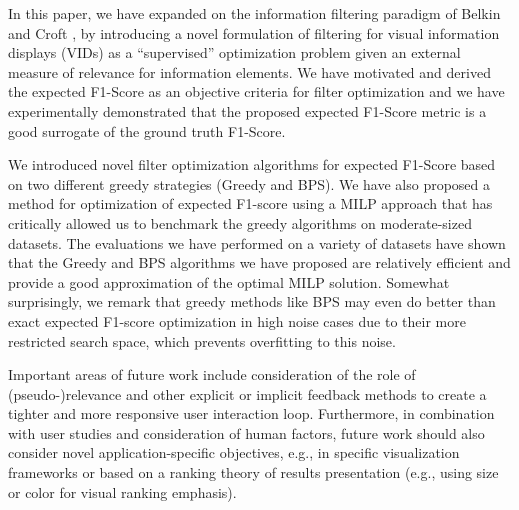 


In this paper, we have expanded on the information filtering paradigm of Belkin and Croft \citep{Belkin1992}, by  introducing a novel formulation of filtering for visual information displays (VIDs) as a ``supervised'' optimization problem given an external measure of relevance for  information elements.  We have motivated and derived the expected F1-Score as an objective criteria for filter optimization and we have experimentally demonstrated that the proposed expected F1-Score metric is a good surrogate of the ground truth F1-Score.

We introduced novel filter optimization algorithms for expected F1-Score based on two different greedy strategies (Greedy and BPS).  We have also proposed a method for optimization of expected F1-score using a MILP approach that has critically allowed us to benchmark the greedy algorithms on moderate-sized datasets. The evaluations we have performed on a variety of datasets have shown that the Greedy and BPS algorithms we have proposed are relatively efficient and provide a good approximation of the optimal MILP solution.  Somewhat surprisingly, we remark that greedy methods like BPS may even do better than exact expected F1-score optimization in high noise cases due to their more restricted search space, which prevents overfitting to this noise. 

Important areas of future work include consideration of the role of (pseudo-)relevance and other explicit or implicit feedback methods to create a tighter and more responsive user interaction loop.
Furthermore, in combination with user studies and consideration of human factors, future work should also consider novel application-specific objectives, e.g.,  in specific visualization frameworks or based on a ranking theory of results presentation (e.g., using size or color for visual ranking emphasis).  


